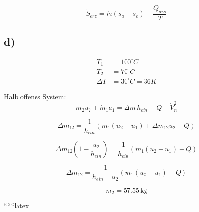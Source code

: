 \begin{equation*}
\dot{S}_{erz} = \dot{m}(s_a - s_e) - \frac{\dot{Q}_{aus}}{T}
\end{equation*}

\subsection*{d)}

\begin{align*}
T_1 &= 100^\circ C \\
T_2 &= 70^\circ C \\
\Delta T &= 30^\circ C = 36K
\end{align*}

Halb offenes System:
\begin{equation*}
m_2 u_2 + \dot{m}_1 u_1 = \Delta m \, h_{ein} + Q - \dot{V}_n^2
\end{equation*}

\begin{equation*}
\Delta m_{12} = \frac{1}{h_{ein}} \left( m_1 (u_2 - u_1) + \Delta m_{12} u_2 - Q \right)
\end{equation*}

\begin{equation*}
\Delta m_{12} \left( 1 - \frac{u_2}{h_{ein}} \right) = \frac{1}{h_{ein}} \left( m_1 (u_2 - u_1) - Q \right)
\end{equation*}

\begin{equation*}
\Delta m_{12} = \frac{1}{h_{ein} - u_2} \left( m_1 (u_2 - u_1) - Q \right)
\end{equation*}

\begin{equation*}
m_2 = 57.55 \, \text{kg}
\end{equation*}

``````latex


